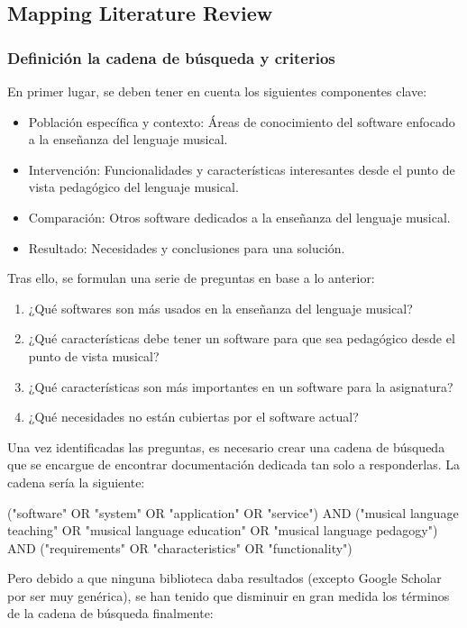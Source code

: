 \subsection {Mapping Literature Review}

\subsubsection{Definición la cadena de búsqueda y criterios}

En primer lugar, se deben tener en cuenta los siguientes componentes clave:

\begin{itemize}
\item Población específica y contexto: Áreas de conocimiento del software enfocado a la enseñanza del lenguaje musical.
\item Intervención: Funcionalidades y características interesantes desde el punto de vista pedagógico del lenguaje musical.
\item Comparación: Otros software dedicados a la enseñanza del lenguaje musical.
\item Resultado: Necesidades y conclusiones para una solución.
\end{itemize}

Tras ello, se formulan una serie de preguntas en base a lo anterior:

\begin{enumerate}
\item ¿Qué softwares son más usados en la enseñanza del lenguaje musical?
\item ¿Qué características debe tener un software para que sea pedagógico desde el punto de vista musical?
\item ¿Qué características son más importantes en un software para la asignatura?
\item ¿Qué necesidades no están cubiertas por el software actual?
\end{enumerate}

Una vez identificadas las preguntas, es necesario crear una cadena de búsqueda que se encargue de encontrar documentación dedicada tan solo a responderlas. La cadena sería la siguiente:

("software" OR "system" OR "application" OR "service") AND ("musical language teaching" OR "musical language education" OR "musical language pedagogy") AND ("requirements" OR "characteristics" OR "functionality")

Pero debido a que ninguna biblioteca daba resultados (excepto Google Scholar por ser muy genérica), se han tenido que disminuir en gran medida los términos de la cadena de búsqueda finalmente:

